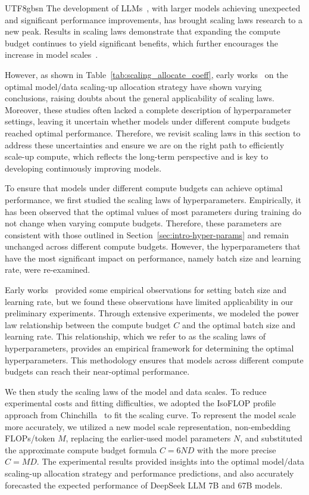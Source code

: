 \documentclass[11pt, a4paper, logo, copyright, nonumbering]{deepseek}
\begin{document}
\begin{CJK*}{UTF8}{gbsn}
The development of LLMs~\citep{dai2019transformer,gpt2}, with larger models achieving unexpected and significant performance improvements, has brought scaling laws research to a new peak. Results in scaling laws demonstrate that expanding the compute budget continues to yield significant benefits, which further encourages the increase in model scales~\citep{brown2020language,smith2022using}.

However, as shown in Table~\ref{tab:scaling_allocate_coeff}, early works~\citep{scalinglaw,chinchilla} on the optimal model/data scaling-up allocation strategy have shown varying conclusions, raising doubts about the general applicability of scaling laws. Moreover, these studies often lacked a complete description of hyperparameter settings, leaving it uncertain whether models under different compute budgets reached optimal performance. Therefore, we revisit scaling laws in this section to address these uncertainties and ensure we are on the right path to efficiently scale-up compute, which reflects the long-term perspective and is key to developing continuously improving models.

To ensure that models under different compute budgets can achieve optimal performance, we first studied the scaling laws of hyperparameters. Empirically, it has been observed that the optimal values of most parameters during training do not change when varying compute budgets. Therefore, these parameters are consistent with those outlined in Section~\ref{sec:intro-hyper-params} and remain unchanged across different compute budgets. However, the hyperparameters that have the most significant impact on performance, namely batch size and learning rate, were re-examined.

Early works~\citep{mccandlish2018empirical,shallue2019measuring,smith2017don,goyal2017accurate, zhang2019algorithmic} provided some empirical observations for setting batch size and learning rate, but we found these observations have limited applicability in our preliminary experiments.
Through extensive experiments, we modeled the power law relationship between the compute budget $C$ and the optimal batch size and learning rate. This relationship, which we refer to as the scaling laws of hyperparameters, provides an empirical framework for determining the optimal hyperparameters. This methodology ensures that models across different compute budgets can reach their near-optimal performance.

We then study the scaling laws of the model and data scales. To reduce experimental costs and fitting difficulties, we adopted the IsoFLOP profile approach from Chinchilla~\citep{chinchilla} to fit the scaling curve. To represent the model scale more accurately, we utilized a new model scale representation, non-embedding FLOPs/token $M$, replacing the earlier-used model parameters $N$, and substituted the approximate compute budget formula $C=6ND$ with the more precise $C=MD$.
The experimental results provided insights into the optimal model/data scaling-up allocation strategy and performance predictions, and also accurately forecasted the expected performance of DeepSeek LLM 7B and 67B models.


\end{CJK*}
\end{document}
